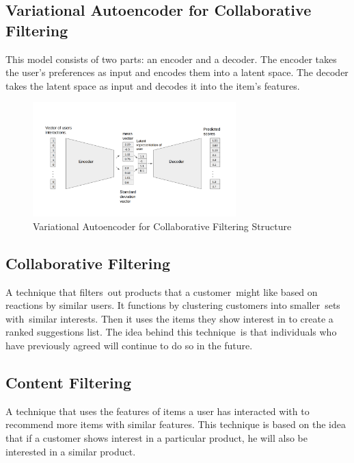 \subsection{Variational Autoencoder for Collaborative Filtering}
This model consists of two parts: an encoder and a decoder. The encoder takes the user's preferences as input and encodes them into a latent space. The decoder takes the latent space as input and decodes it into the item's features.
\begin{figure}[H]
    \centering
    \includegraphics[width=0.7\textwidth]{assets/variational-autoencoder.png}
    \caption[Variational Autoencoder for Collaborative Filtering Structure]{Variational Autoencoder for Collaborative Filtering Structure \cite{NvidiaRecSys}}
    \label{fig:variational-autoencoder-for-collaborative-filtering}
\end{figure}
\subsection{Collaborative Filtering}
A technique that filters out products that a customer might like based on reactions by similar users. It functions by clustering customers into smaller sets with similar interests. Then it uses the items they show interest in to create a ranked suggestions list. The idea behind this technique is that individuals who have previously agreed will continue to do so in the future.
\subsection{Content Filtering}
A technique that uses the features of items a user has interacted with to recommend more items with similar features. This technique is based on the idea that if a customer shows interest in a particular product, he will also be interested in a similar product. \\



